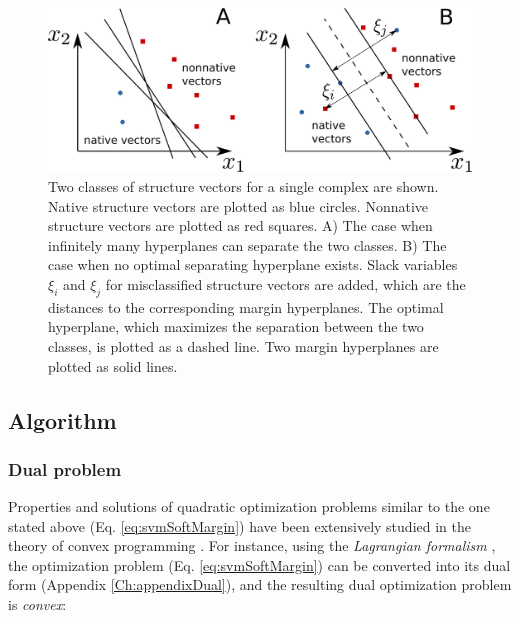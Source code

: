 \begin{figure}[H]
\begin{center}
\includegraphics[scale=0.5]{Scoring/Fig/MNSolution_7Sep_1.pdf}
\caption[Two classes of structure vectors for a single complex]{Two classes of structure vectors for a single complex are shown. 
Native structure vectors are plotted as blue circles. 
Nonnative structure vectors are plotted as red squares. 
A) The case when infinitely many hyperplanes can separate the two classes. 
B) The case when no optimal separating hyperplane exists. 
Slack variables $\xi_i$ and $\xi_j$ for misclassified structure vectors are added, which are the distances to the corresponding margin hyperplanes. 
The optimal hyperplane, which maximizes the separation between the two classes, is plotted as a dashed line.
 Two margin hyperplanes are plotted as solid lines.
}
\label{fig:MNSolutions} 
\end{center}
\end{figure}%

\subsection{Algorithm}
\label{bsvm}
\subsubsection{Dual problem}
Properties and solutions of quadratic optimization problems similar to the one stated above (Eq. \ref{eq:svmSoftMargin}) 
have been extensively studied in the theory of convex programming \cite{Boyd2004,Vapnik2000}.
For instance, using the {\em Lagrangian formalism} , the optimization problem (Eq. \ref{eq:svmSoftMargin}) can be converted into its dual form (Appendix \ref{Ch:appendixDual}), 
and the resulting dual optimization problem is \emph{convex}:

